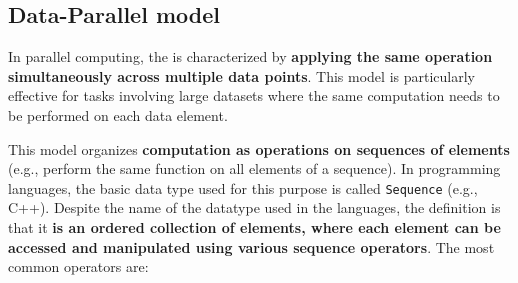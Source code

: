 \subsection{Data-Parallel model}

In parallel computing, the  is characterized by \textbf{applying the same operation simultaneously across multiple data points}. This model is particularly effective for tasks involving large datasets where the same computation needs to be performed on each data element.

\highspace
This model organizes \textbf{computation as operations on sequences of elements} (e.g., perform the same function on all elements of a sequence). In programming languages, the basic data type used for this purpose is called \texttt{Sequence} (e.g., C++). Despite the name of the datatype used in the languages, the definition is that it \textbf{is an ordered collection of elements, where each element can be accessed and manipulated using various sequence operators}. The most common operators are:
